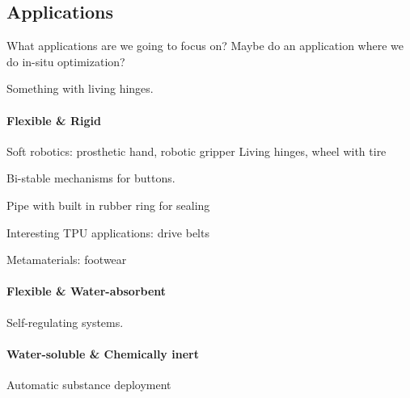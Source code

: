 \subsection{Applications}

What applications are we going to focus on?
Maybe do an application where we do in-situ optimization?

Something with living hinges.

\paragraph{Flexible \& Rigid}
Soft robotics: prosthetic hand, robotic gripper
Living hinges, wheel with tire

Bi-stable mechanisms for buttons.

Pipe with built in rubber ring for sealing

Interesting TPU applications: drive belts

Metamaterials: footwear

\paragraph{Flexible \& Water-absorbent}
Self-regulating systems.

\paragraph{Water-soluble \& Chemically inert}
Automatic substance deployment

